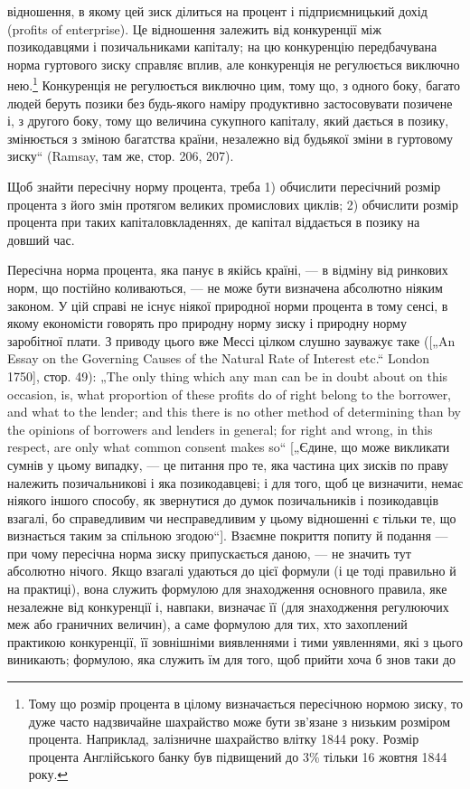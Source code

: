 \parcont{}  %
відношення, в якому цей зиск ділиться на процент і підприємницький
дохід (profits of enterprise). Це відношення залежить
від конкуренції між позикодавцями і позичальниками капіталу;
на цю конкуренцію передбачувана норма гуртового зиску
справляє вплив, але конкуренція не регулюється виключно нею.\footnote{
Тому що розмір процента в цілому визначається пересічною нормою
зиску, то дуже часто надзвичайне шахрайство може бути зв’язане з низьким
розміром процента. Наприклад, залізничне шахрайство влітку 1844 року. Розмір
процента Англійського банку був підвищений до 3\% тільки 16 жовтня
1844 року.
}
Конкуренція не регулюється виключно цим, тому що, з одного
боку, багато людей беруть позики без будь-якого наміру продуктивно
застосовувати позичене і, з другого боку, тому що величина
сукупного капіталу, який дається в позику, змінюється з зміною
багатства країни, незалежно від будьякої зміни в гуртовому
зиску“ (Ramsay, там же, стор. 206, 207).

Щоб знайти пересічну норму процента, треба 1) обчислити
пересічний розмір процента з його змін протягом великих промислових
циклів; 2) обчислити розмір процента при таких капіталовкладеннях,
де капітал віддається в позику на довший час.

Пересічна норма процента, яка панує в якійсь країні, — в відміну
від ринкових норм, що постійно коливаються, — не може бути
визначена абсолютно ніяким законом. У цій справі не існує ніякої
природної норми процента в тому сенсі, в якому економісти
говорять про природну норму зиску і природну норму заробітної
плати. З приводу цього вже Мессі цілком слушно зауважує
таке ([„An Essay on the Governing Causes of the Natural Rate of Interest
etc.“ London 1750], стор. 49): „The only thing which any man can
be in doubt about on this occasion, is, what proportion of these profits
do of right belong to the borrower, and what to the lender; and this there
is no other method of determining than by the opinions of borrowers
and lenders in general; for right and wrong, in this respect, are
only what common consent makes so“ [„Єдине, що може викликати
сумнів у цьому випадку, — це питання про те, яка частина цих
зисків по праву належить позичальникові і яка позикодавцеві;
і для того, щоб це визначити, немає ніякого іншого способу, як
звернутися до думок позичальників і позикодавців взагалі, бо
справедливим чи несправедливим у цьому відношенні є тільки те,
що визнається таким за спільною згодою“]. Взаємне покриття
попиту й подання — при чому пересічна норма зиску припускається
даною, — не значить тут абсолютно нічого. Якщо взагалі
удаються до цієї формули (і це тоді правильно й на практиці),
вона служить формулою для знаходження основного правила,
яке незалежне від конкуренції і, навпаки, визначає її (для знаходження
регулюючих меж або граничних величин), а саме формулою
для тих, хто захоплений практикою конкуренції, її зовнішніми
виявленнями і тими уявленнями, які з цього виникають; формулою,
яка служить їм для того, щоб прийти хоча б знов таки до
\parbreak{}  %
